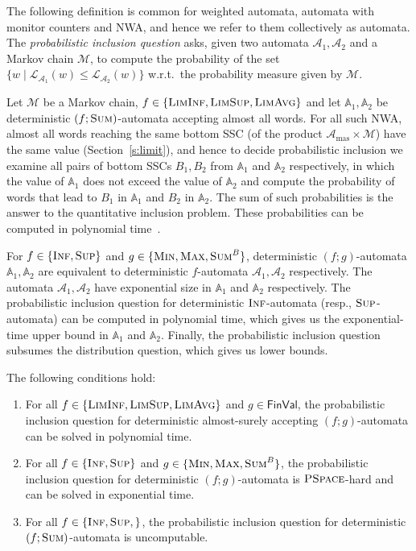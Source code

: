 \documentclass{lmcs}
\newcommand{\proofideas}{\smallskip\noindent{\emph{The key ideas.}}}
\newcommand{\masterA}{\mathcal{A}_{\textrm{mas}}}
\newcommand{\nestedA}{\mathbb{A}}
\newcommand{\nonnestedA}{\mathcal{A}}
\newcommand{\valueL}[1]{\mathcal{L}_{{#1}}}
\newcommand{\PSPACE}{\textsc{PSpace}{}}
\newcommand{\fsum}{\textsc{Sum}}
\newcommand{\fBsum}[1]{\textsc{Sum}^{#1}}
\newcommand{\fmax}{\textsc{Max}}
\newcommand{\fmin}{\textsc{Min}}
\newcommand{\flimavg}{\textsc{LimAvg}}
\newcommand{\fliminf}{\textsc{LimInf}}
\newcommand{\flimsup}{\textsc{LimSup}}
\newcommand{\fsup}{\textsc{Sup}}
\newcommand{\finf}{\textsc{Inf}}
\newcommand{\aut}{\mathcal{A}}
\newcommand{\FinVal}{\mathsf{FinVal}}
\newcommand{\markov}{\mathcal{M}}
\begin{document}
The following definition is common for weighted automata, automata with monitor counters and NWA, and hence we refer to them collectively as automata.
The \emph{probabilistic inclusion question} asks, given two automata $\aut_1, \aut_2$ and a Markov chain $\markov$, to compute the probability of the set
$\{ w \mid \valueL{\aut_1}(w) \leq \valueL{\aut_2}(w) \}$ w.r.t.\ the probability measure given by $\markov$.
\smallskip


\proofideas{}
Let $\markov$ be a Markov chain, $f \in \{\fliminf, \flimsup, \flimavg\}$ and let $\nestedA_1, \nestedA_2$ be deterministic $(f;\fsum)$-automata accepting almost all words.
For all such NWA, almost all words reaching the same bottom SSC (of the product $\masterA \times \markov$) have the same value (Section~\ref{s:limit}), and hence
to decide probabilistic inclusion we examine all pairs of bottom SSCs $B_1, B_2$ from $\nestedA_1$ and $\nestedA_2$ respectively, in which the value of $\nestedA_1$ does not exceed the value of $\nestedA_2$
and compute the probability of words that lead to $B_1$ in $\nestedA_1$ and $B_2$ in $\nestedA_2$. The sum of such probabilities is the answer to the quantitative inclusion problem.
These probabilities can be computed in polynomial time~\cite{BaierBook}.

For $f \in \{\finf,\fsup\}$ and $g \in \{\fmin, \fmax, \fBsum{B} \}$, deterministic $(f;g)$-automata $\nestedA_1, \nestedA_2$ are equivalent to deterministic $f$-automata $\nonnestedA_1, \nonnestedA_2$ respectively.
The automata $\nonnestedA_1, \nonnestedA_2$ have exponential size in $\nestedA_1$ and $\nestedA_2$ respectively.
The probabilistic inclusion question for deterministic $\finf$-automata (resp., $\fsup$-automata) can be computed in polynomial time, which gives us the exponential-time upper bound in $\nestedA_1$ and $\nestedA_2$.
Finally, the probabilistic inclusion question subsumes the distribution question, which gives us lower bounds.

\begin{thm}
The following conditions hold:
\begin{enumerate}
\item For all $f \in \{\fliminf, \flimsup, \flimavg\}$ and $g \in \FinVal$, the probabilistic inclusion question for deterministic almost-surely accepting $(f;g)$-automata can be solved in polynomial time.
\item For all $f \in \{\finf, \fsup\}$ and $g \in \{ \fmin, \fmax, \fBsum{B} \}$, the probabilistic inclusion question for deterministic $(f;g)$-automata is $\PSPACE$-hard and can be solved in
exponential time.
\item For all $f \in \{\finf, \fsup,\}$, the probabilistic inclusion question for deterministic $(f;\fsum)$-automata is uncomputable.
\end{enumerate}
\end{thm}
\end{document}
